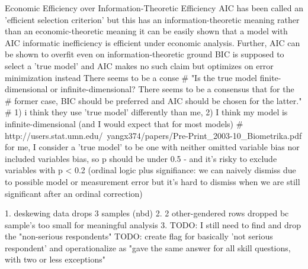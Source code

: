 \documentclass[review]{elsarticle}
\begin{document}
Economic Efficiency over Information-Theoretic Efficiency
AIC has been called an 'efficient selection criterion' but this has an information-theoretic meaning rather than an economic-theoretic meaning
it can be easily shown that a model with AIC informatic inefficiency is efficient under economic analysis.
Further, AIC can be shown to overfit even on information-theoretic ground
BIC is supposed to select a 'true model' and AIC makes no such claim but optimizes on error minimization instead
There seems to be a conse
# "Is the true model finite-dimensional or infinite-dimensional? There seems to be a consensus that for the
#   former case, BIC should be preferred and AIC should be chosen for the latter."
# 1) i think they use 'true model' differently than me, 2) I think my model is infinite-dimensional (and I would expect that for most models)
# http://users.stat.umn.edu/~yangx374/papers/Pre-Print_2003-10_Biometrika.pdf
for me, I consider a 'true model' to be one with neither omitted variable bias nor included variables bias, so p should be under 0.5
  - and it's risky to exclude variables with p < 0.2 (ordinal logic plus signifiance:
  we can naively dismiss due to possible model or measurement error
  but it's hard to dismiss when we are still significant after an ordinal correction)




1. deskewing data drops 3 samples (nbd)
2. 2 other-gendered rows dropped bc sample's too small for meaningful analysis
3. TODO: I still need to find and drop the "non-serious respondents"
TODO: create flag for basically 'not serious respondent' and operationalize as "gave the same answer for all skill questions, with two or less exceptions"
\end{document}
